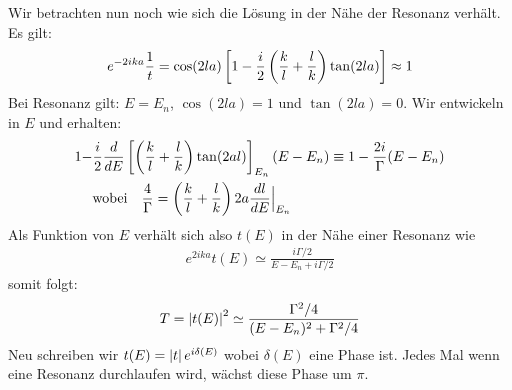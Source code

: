 Wir betrachten nun noch wie sich die Lösung in der Nähe der Resonanz verhält.
Es gilt:
\begin{align*}
    e^{-2 i k a} \frac{1}{t} = \cos(2 l a) \left[ 1 - \frac{i}{2} \left( \frac{k}{l} + \frac{l}{k} \right) \tan(2 l a) \right] \approx 1
\end{align*}
Bei Resonanz gilt: $E=E_n$, $\cos(2 l a) = 1$ und $\tan(2 l a) = 0$. Wir entwickeln
in $E$ und erhalten:
\begin{align*}
    1 -& \frac{i}{2} \frac{d}{dE} \left[ \left( \frac{k}{l} + \frac{l}{k} \right) \tan(2 a l) \right]_{E_n} (E-E_n)
    \equiv 1 - \frac{2i}{\Gamma} (E-E_n)
    \\
    &\text{wobei} \hspace{10pt} \frac{4}{\Gamma} = \left( \frac{k}{l} + \frac{l}{k} \right) 2 a \frac{dl}{dE} \Big|_{E_n}
\end{align*}
Als Funktion von $E$ verhält sich also $t(E)$ in der Nähe einer Resonanz wie
\begin{align*}
    e^{2 i k a} t(E) \simeq \frac{i \Gamma/2}{E - E_n + i \Gamma/2}
\end{align*}
somit folgt:
\begin{align*}
    T = \left\vert t(E) \right\vert^2 \simeq \frac{\Gamma^2/4}{(E-E_n)^2 + \Gamma^2/4}
\end{align*}
Neu schreiben wir $t(E) = \left\vert t \right\vert e^{i \delta(E)}$ wobei $\delta(E)$ eine Phase ist.
Jedes Mal wenn eine Resonanz durchlaufen wird, wächst diese Phase um $\pi$.